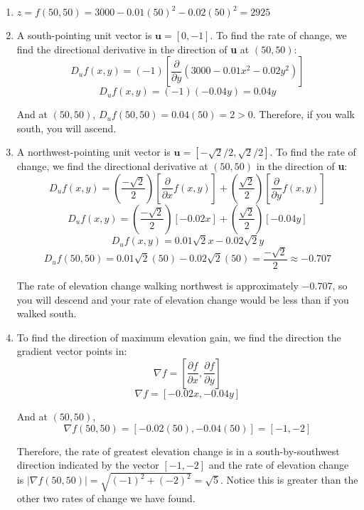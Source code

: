 \begin{Answer}[ref = maximum]
\begin{enumerate}
    \item $z = f(50, 50) = 3000 - 0.01(50)^2 - 0.02(50)^2 = 2925$
    \item A south-pointing unit vector is $\textbf{u} = \left[ 0, -1 \right]$. 
    To find the rate of change, we find the directional derivative in the 
    direction of \textbf{u} at $(50, 50)$:
    $$D_u f(x, y) = \left( -1 \right) \left[ \frac{\partial}{\partial y} 
    \left( 3000 - 0.01x^2 - 0.02y^2 \right) \right]$$
    $$D_u f(x, y) = \left( -1 \right) \left( -0.04 y \right) = 0.04y$$

    And at $(50, 50)$, $D_u f(50, 50) = 0.04(50) = 2 > 0$. Therefore, if you 
    walk south, you will ascend.
    \item A northwest-pointing unit vector is $\textbf{u} = \left[ -\sqrt{2}
    /2, \sqrt{2}/2 \right]$. To find the rate of change, we find the 
    directional derivative at $(50, 50)$ in the direction of \textbf{u}:
    $$D_u f(x, y) = \left( \frac{-\sqrt{2}}{2} \right) \left[ \frac{\partial}{
    \partial x} f(x, y) \right] + \left( \frac{\sqrt{2}}{2} \right) \left[ 
    \frac{\partial}{\partial y} f(x, y) \right]$$
    $$D_u f(x, y) = \left( \frac{-\sqrt{2}}{2} \right) \left[ -0.02x \right] 
    + \left( \frac{\sqrt{2}}{2} \right) \left[ -0.04 y \right]$$
    $$D_u f(x, y) = 0.01\sqrt{2}x - 0.02\sqrt{2}y$$
    $$D_u f(50, 50) = 0.01 \sqrt{2} \left( 50 \right) - 0.02 \sqrt{2} \left( 
    50 \right) = \frac{-\sqrt{2}}{2} \approx -0.707$$

    The rate of elevation change walking northwest is approximately $-0.707$, 
    so you will descend and your rate of elevation change would be less than 
    if you walked south. 

    \item To find the direction of maximum elevation gain, we find the 
    direction the gradient vector points in:
    $$\nabla f = \left[ \frac{\partial f}{\partial x}, \frac{\partial f}{
    \partial y} \right]$$
    $$\nabla f = \left[ -0.02x, -0.04y \right]$$

    And at $(50, 50)$, 
    $$\nabla f(50, 50) = \left[ -0.02(50), -0.04(50) \right] = \left[ -1, -2 
    \right]$$

    Therefore, the rate of greatest elevation change is in a south-by-southwest 
    direction indicated by the vector $\left[ -1, -2 \right]$ and the rate of 
    elevation change is $\left| \nabla f(50, 50) \right| = \sqrt{(-1)^2 + (-2)^
    2} = \sqrt{5}$. Notice this is greater than the other two rates of change 
    we have found. 
\end{enumerate}
\end{Answer}

